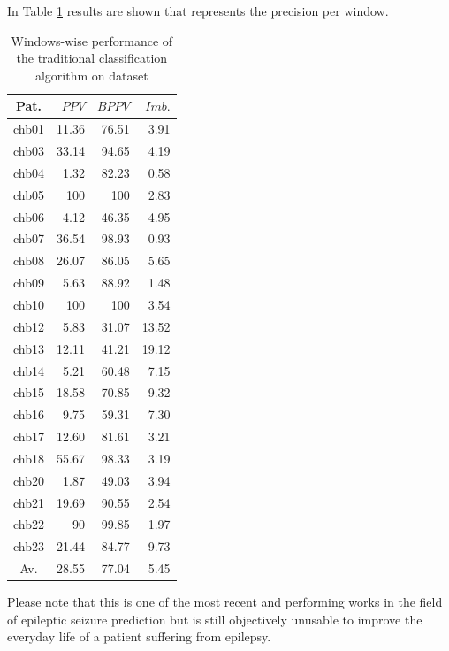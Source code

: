 In Table \ref{tab:siena-performance-windows} results are shown that represents the precision per window.

\begin{table}[ht]
    \centering
    \begin{tabular}{c|rrr}
    Pat.  & $PPV$   & $BPPV$  & $Imb.$  \\ \hline
    chb01 & 11.36 & 76.51 & 3.91  \\
    chb03 & 33.14 & 94.65 & 4.19  \\
    chb04 & 1.32  & 82.23 & 0.58  \\
    chb05 & 100   & 100   & 2.83  \\
    chb06 & 4.12  & 46.35 & 4.95  \\
    chb07 & 36.54 & 98.93 & 0.93  \\
    chb08 & 26.07 & 86.05 & 5.65  \\
    chb09 & 5.63  & 88.92 & 1.48  \\
    chb10 & 100   & 100   & 3.54  \\
    chb12 & 5.83  & 31.07 & 13.52 \\
    chb13 & 12.11 & 41.21 & 19.12 \\
    chb14 & 5.21  & 60.48 & 7.15  \\
    chb15 & 18.58 & 70.85 & 9.32  \\
    chb16 & 9.75  & 59.31 & 7.30  \\
    chb17 & 12.60 & 81.61 & 3.21  \\
    chb18 & 55.67 & 98.33 & 3.19  \\
    chb20 & 1.87  & 49.03 & 3.94  \\
    chb21 & 19.69 & 90.55 & 2.54  \\
    chb22 & 90    & 99.85 & 1.97  \\
    chb23 & 21.44 & 84.77 & 9.73  \\ \hline
    Av.   & 28.55 & 77.04 & 5.45  \\ \hline
    \end{tabular}
    \caption{Windows-wise performance of the traditional classification algorithm on  dataset \cite{detti_patient-specific_2019}}
    \label{tab:siena-performance-windows} 
\end{table}

Please note that this is one of the most recent and performing works in the field of epileptic seizure prediction but is still objectively unusable to improve the everyday life of a patient suffering from epilepsy.

